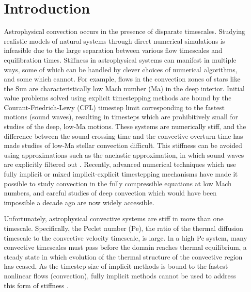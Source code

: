 \documentclass[aps, pre, onecolumn, nofootinbib, notitlepage, groupedaddress, amsfonts, amssymb, amsmath, longbibliography]{revtex4-1}
\begin{document}
\section{Introduction}
\label{sec:intro}
Astrophysical convection occurs in the presence of disparate timescales. 
Studying realistic models of natural systems through direct numerical
simulations is infeasible due to the
large separation between various flow timescales and equilibration times.
Stiffness in astrophysical systems can manifest in multiple ways, some of which can
be handled by clever choices of numerical algorithms, and some which cannot.
For example,
flows in the convection zones of stars like the Sun are characteristically low Mach number
(Ma) in the deep interior. Initial value problems solved using
explicit timestepping methods are bound by the Courant-Friedrich-Lewy
(CFL) timestep limit corresponding to the fastest motions (sound
waves), resulting in timesteps which are prohibitively
small for studies of the deep, low-Ma motions. These systems are numerically
stiff, and the difference between
the sound crossing time and the convective overturn time has made studies of low-Ma stellar
convection difficult. This stiffness can be avoided using approximations such as
the anelastic approximation, in which sound waves are explicitly filtered out
\cite{brown&all2010, featherstone&hindman2016}.
Recently, advanced numerical techniques which use fully implicit 
\cite{viallet&all2011, viallet&all2013, viallet&all2016} or mixed
implicit-explicit \cite{lecoanet&all2014, anders&brown2017, bordwell&all2018} 
timestepping mechanisms have made it possible to study
convection in the fully compressible equations at low Mach numbers, 
and careful studies of deep convection which
would have been impossible a decade ago are now widely accessible.

Unfortunately, astrophysical convective systems are stiff in more than one 
timescale. Specifically, the Peclet number (Pe), the ratio of the thermal
diffusion timescale to the convective velocity timescale, is large.
In a high Pe system, many convective timescales must pass before 
the domain reaches thermal equilibrium, a steady state in which
evolution of the thermal structure of the convective region has ceased.
As the timestep size of implicit methods is bound to the fastest nonlinear flows
(convection), fully implicit methods cannot be used to address this form of stiffness
\cite{viallet&all2011, viallet&all2013, viallet&all2016}. 
\end{document}
